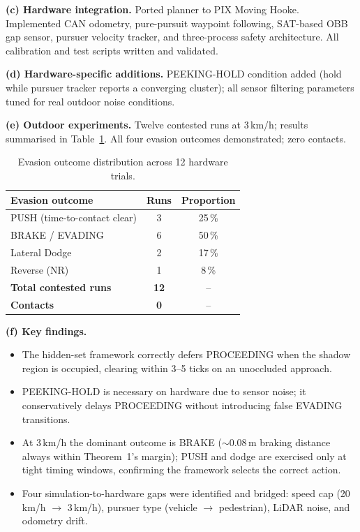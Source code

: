 \documentclass[11pt,a4paper]{article}
\begin{document}
\noindent\textbf{(c) Hardware integration.} Ported planner to PIX Moving Hooke.
Implemented CAN odometry, pure-pursuit waypoint following, SAT-based OBB gap sensor,
pursuer velocity tracker, and three-process safety architecture. All calibration and
test scripts written and validated.

\noindent\textbf{(d) Hardware-specific additions.} PEEKING-HOLD condition added (hold
while pursuer tracker reports a converging cluster); all sensor filtering parameters
tuned for real outdoor noise conditions.

\noindent\textbf{(e) Outdoor experiments.} Twelve contested runs at 3\,km/h; results
summarised in Table~\ref{tab:results}. All four evasion outcomes demonstrated; zero
contacts.

\begin{table}[H]
\centering
\small
\begin{tabular}{lcc}
\toprule
Evasion outcome & Runs & Proportion \\
\midrule
PUSH (time-to-contact clear) & 3 & 25\,\% \\
BRAKE / EVADING              & 6 & 50\,\% \\
Lateral Dodge                & 2 & 17\,\% \\
Reverse (NR)                 & 1 & \phantom{0}8\,\% \\
\midrule
\textbf{Total contested runs} & \textbf{12} &  --  \\
\textbf{Contacts}             & \textbf{0}  &  --  \\
\bottomrule
\end{tabular}
\caption{\small Evasion outcome distribution across 12 hardware trials.}
\label{tab:results}
\end{table}

\noindent\textbf{(f) Key findings.}
\begin{itemize}
  \item The hidden-set framework correctly defers PROCEEDING when the shadow region is
        occupied, clearing within 3--5 ticks on an unoccluded approach.
  \item PEEKING-HOLD is necessary on hardware due to sensor noise; it conservatively
        delays PROCEEDING without introducing false EVADING transitions.
  \item At 3\,km/h the dominant outcome is BRAKE (${\sim}$0.08\,m braking distance always
        within Theorem~1's margin); PUSH and dodge are exercised only at tight timing
        windows, confirming the framework selects the correct action.
  \item Four simulation-to-hardware gaps were identified and bridged: speed cap
        (20\,km/h $\to$ 3\,km/h), pursuer type (vehicle $\to$ pedestrian), LiDAR
        noise, and odometry drift.
\end{itemize}
\end{document}
